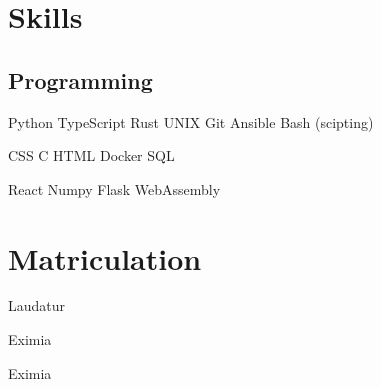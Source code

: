 \documentclass[]{plushcv}
\begin{document}
\hfill
\begin{minipage}[t]{0.25\textwidth} 


\section{Skills}
\subsection{Programming}
\sectionsep

Python \textbullet{} TypeScript \textbullet{} Rust \textbullet{} UNIX \textbullet{} Git  \textbullet{} Ansible \textbullet{} Bash (scipting) \\
\sectionsep

CSS \textbullet{} C \textbullet{} HTML \textbullet{} Docker  \textbullet{} SQL  \\
\sectionsep

React \textbullet{} Numpy \textbullet{} Flask \textbullet{} WebAssembly

\sectionsep
\sectionsep


\section{Matriculation} 

Laudatur \\
\sectionsep

Eximia \\
\sectionsep

Eximia \\
\sectionsep

\sectionsep



\end{minipage}
\end{document}
